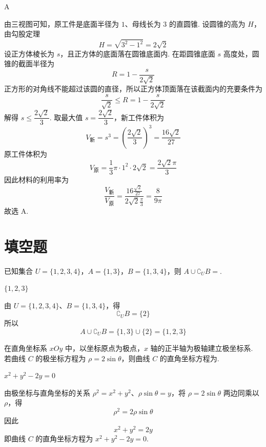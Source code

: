 \begin{answer}
A
\end{answer}

\begin{solution}
由三视图可知，原工件是底面半径为 \(1\)、母线长为 \(3\) 的直圆锥. 设圆锥的高为 \(H\)，由勾股定理
\[
H=\sqrt{3^2-1^2}=2\sqrt2
\]
设正方体棱长为 \(s\)，且正方体的底面落在圆锥底面内. 在距圆锥底面 \(s\) 高度处，圆锥的截面半径为
\[
R=1-\frac{s}{2\sqrt2}
\]
正方形的对角线不能超过该圆的直径，所以正方体顶面落在该截面内的充要条件为
\[
\frac{s}{\sqrt2}\leqslant R=1-\frac{s}{2\sqrt2}
\]
解得 \(s\leqslant\dfrac{2\sqrt2}{3}\). 取最大值 \(s=\dfrac{2\sqrt2}{3}\)，新工件体积为
\[
V_{\text{新}}=s^3=\left(\frac{2\sqrt2}{3}\right)^3=\frac{16\sqrt2}{27}
\]
原工件体积为
\[
V_{\text{原}}=\frac13\pi\cdot1^2\cdot2\sqrt2=\frac{2\sqrt2\pi}{3}
\]
因此材料的利用率为
\[
\frac{V_{\text{新}}}{V_{\text{原}}}
 =\frac{16\frac{\sqrt2}{27}}{2\sqrt2\frac{\pi}{3}}=\frac{8}{9\pi}
\]
故选 A.
\end{solution}

\section{填空题}

\begin{problem}
已知集合 \(U = \{1, 2, 3, 4\}\)，\(A = \{1, 3\}\)，\(B = \{1, 3, 4\}\)，则 \(A \cup \complement_U B = \)\fillinblank{}.
\end{problem}

\begin{answer}
\(\{1,2,3\}\)
\end{answer}

\begin{solution}
由 \(U=\{1,2,3,4\}\)、\(B=\{1,3,4\}\)，得
\[
\complement_U B=\{2\}
\]
所以
\[
A\cup\complement_U B=\{1,3\}\cup\{2\}=\{1,2,3\}
\]
\end{solution}

\begin{problem}
在直角坐标系 \(xOy\) 中，以坐标原点为极点，\(x\) 轴的正半轴为极轴建立极坐标系. 若曲线 \(C\) 的极坐标方程为 \(\rho = 2\sin \theta\)，则曲线 \(C\) 的直角坐标方程为\fillinblank{}.
\end{problem}

\begin{answer}
\(x^2+y^2-2y=0\)
\end{answer}

\begin{solution}
由极坐标与直角坐标的关系 \(\rho^2=x^2+y^2\)、\(\rho\sin\theta=y\)，将 \(\rho=2\sin\theta\) 两边同乘以 \(\rho\)，得
\[
\rho^2=2\rho\sin\theta
\]
因此
\[
x^2+y^2=2y
\]
即曲线 \(C\) 的直角坐标方程为 \(x^2+y^2-2y=0\).
\end{solution}

